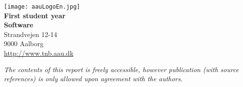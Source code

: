 \begin{titlingpage}
\begin{minipage}[t]{0.5\textwidth}
\begin{flushright}
	\texttt{[image: aauLogoEn.jpg]}\\
		\small \textbf{First student year} \\
		\small \textbf{Software}\\
		\small Strandvejen 12-14 \\
		\small 9000 Aalborg \\
		\small \url{http://www.tnb.aau.dk}\\
		\bigskip
		\fbox{
  		\parbox{\linewidth}{
     		{
     		}
     	}}
\end{flushright}
\end{minipage}
\vfill\footnotesize{\textit{The contents of this report is freely accessible, however publication (with source references) is only allowed upon agreement with the authors.}}
\end{titlingpage}